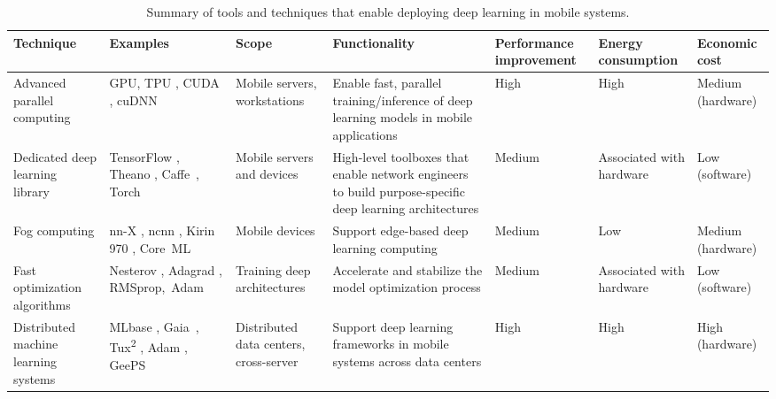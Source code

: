 \documentclass[journal,comsoc,letter]{IEEEtran}
\begin{document}
\begin{table*}[htb]
\centering
\caption{Summary of tools and techniques that enable deploying deep learning in mobile systems.}
\label{tab:enabler}
\begin{tabular}{|C{2cm}|C{2.5cm}|C{2cm}|C{3.5cm}|C{2cm}|C{1.5cm}|C{1.5cm}|}
\hline
\textbf{Technique} & \textbf{Examples} & \textbf{Scope} & \textbf{Functionality} & \textbf{Performance improvement}& \textbf{Energy consumption}& \textbf{Economic cost}\\ \hline
Advanced parallel computing      &   GPU, TPU \cite{jouppi2017datacenter}, CUDA \cite{nickolls2008scalable}, cuDNN~\cite{chetlur2014cudnn}       &     Mobile servers, workstations               &   Enable fast, parallel training/inference of deep learning models in mobile applications    &   High &High &Medium (hardware) \\ \hline
Dedicated deep learning library     &    TensorFlow \cite{tensorflow2015-whitepaper}, Theano \cite{2016arXiv160502688short}, Caffe~\cite{jia2014caffe}, Torch~\cite{torch}      &       Mobile servers and devices                &   High-level toolboxes that enable network engineers to build purpose-specific deep learning architectures    &   Medium &Associated with hardware & Low (software) \\ \hline
Fog computing &nn-X \cite{gokhale2014240}, ncnn \cite{ncnn}, Kirin 970 \cite{huawei2017kirin}, Core~ML~\cite{coreml}& Mobile devices & Support edge-based deep learning computing & Medium & Low & Medium (hardware) \\ \hline
Fast optimization algorithms     &    Nesterov \cite{sutskever2013importance}, Adagrad \cite{dean2012large}, RMSprop,~Adam~\cite{kingma2015adam}      &       Training deep architectures                &   Accelerate and stabilize the model optimization process &   Medium & Associated with hardware & Low (software)   \\ \hline
Distributed machine learning systems    &   MLbase \cite{kraska2013mlbase}, Gaia~\cite{hsieh2017gaia}, Tux\textsuperscript{2} \cite{xiao2017tux2}, Adam \cite{chilimbi2014project}, GeePS~\cite{cui2016geeps}       &      Distributed data centers, cross-server  &     Support deep learning frameworks in mobile systems across data centers    &   High &High&High (hardware) \\ \hline
\end{tabular}
\end{table*}
\end{document}

